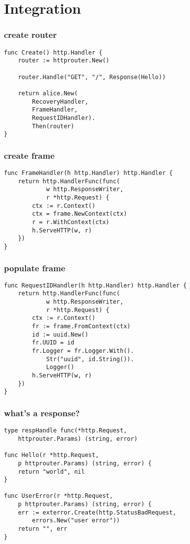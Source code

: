 \documentclass{beamer}
\begin{document}
\section{Integration}

\begin{frame}[fragile]
\frametitle{create router}
\begin{lstlisting}[basicstyle=\ttfamily\footnotesize]
func Create() http.Handler {
	router := httprouter.New()

	router.Handle("GET", "/", Response(Hello))

	return alice.New(
		RecoveryHandler,
		FrameHandler,
		RequestIDHandler).
		Then(router)
}
\end{lstlisting}
\end{frame}

\begin{frame}[fragile]
\frametitle{create frame}
\begin{lstlisting}[basicstyle=\ttfamily\footnotesize]
func FrameHandler(h http.Handler) http.Handler {
	return http.HandlerFunc(func(
			w http.ResponseWriter,
			r *http.Request) {
		ctx := r.Context()
		ctx = frame.NewContext(ctx)
		r = r.WithContext(ctx)
		h.ServeHTTP(w, r)
	})
}
\end{lstlisting}
\end{frame}

\begin{frame}[fragile]
\frametitle{populate frame}
\begin{lstlisting}[basicstyle=\ttfamily\footnotesize]
func RequestIDHandler(h http.Handler) http.Handler {
	return http.HandlerFunc(func(
			w http.ResponseWriter,
			r *http.Request) {
		ctx := r.Context()
		fr := frame.FromContext(ctx)
		id := uuid.New()
		fr.UUID = id
		fr.Logger = fr.Logger.With().
			Str("uuid", id.String()).
			Logger()
		h.ServeHTTP(w, r)
	})
}
\end{lstlisting}
\end{frame}

\begin{frame}[fragile]
\frametitle{what's a response?}
\begin{lstlisting}[basicstyle=\ttfamily\footnotesize]
type respHandle func(*http.Request,
	httprouter.Params) (string, error)

func Hello(r *http.Request,
	p httprouter.Params) (string, error) {
	return "world", nil
}

func UserError(r *http.Request,
	p httprouter.Params) (string, error) {
	err := exterror.Create(http.StatusBadRequest,
		errors.New("user error"))
	return "", err
}
\end{lstlisting}
\end{frame}	
\end{document}

